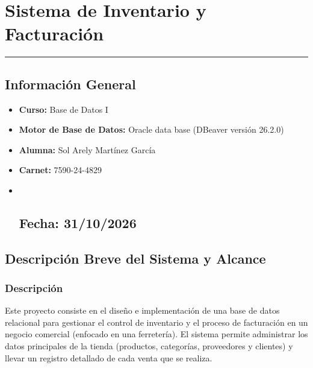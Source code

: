 \documentclass[
]{article}
\author{}
\date{\vspace{-2.5em}}
\begin{document}
\section{Sistema de Inventario y
Facturación}\label{sistema-de-inventario-y-facturaciuxf3n}

\begin{center}\rule{0.5\linewidth}{0.5pt}\end{center}

\subsection{Información General}\label{informaciuxf3n-general}

\begin{itemize}
\item
  \textbf{Curso:} Base de Datos I\\
\item
  \textbf{Motor de Base de Datos:} Oracle data base (DBeaver versión
  26.2.0)
\item
  \textbf{Alumna:} Sol Arely Martínez García\\
\item
  \textbf{Carnet:} 7590-24-4829
\item ~
  \subsection{\texorpdfstring{\textbf{Fecha:}
  31/10/2026}{Fecha: 31/10/2026}}\label{fecha-31102026}
\end{itemize}

\subsection{Descripción Breve del Sistema y
Alcance}\label{descripciuxf3n-breve-del-sistema-y-alcance}

\subsubsection{Descripción}\label{descripciuxf3n}

Este proyecto consiste en el diseño e implementación de una base de
datos relacional para gestionar el control de inventario y el proceso de
facturación en un negocio comercial (enfocado en una ferretería). El
sistema permite administrar los datos principales de la tienda
(productos, categorías, proveedores y clientes) y llevar un registro
detallado de cada venta que se realiza.
\end{document}
